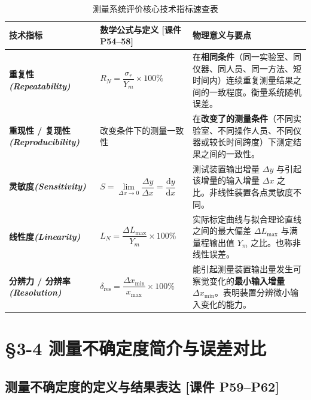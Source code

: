 \documentclass[11pt,a4paper]{ctexart}
\begin{document}
\begin{table}[htbp]
\centering
\small
\renewcommand{\arraystretch}{1.35}
\begin{tabularx}{\textwidth}{p{2.8cm}p{4.2cm}X}
\toprule
\textbf{技术指标} & \textbf{数学公式与定义 [课件 P54--58]} & \textbf{物理意义与要点} \\
\midrule
\textbf{重复性\newline\textit{(Repeatability)}} & $R_N = \dfrac{\sigma_r}{Y_m} \times 100\%$ & 在\textbf{相同条件}（同一实验室、同仪器、同人员、同一方法、短时间内）连续重复测量结果之间的一致程度。衡量系统随机误差。 \\
\midrule
\textbf{重现性 / 复现性\newline\textit{(Reproducibility)}} & 改变条件下的测量一致性 & 在\textbf{改变了的测量条件}（不同实验室、不同操作人员、不同仪器或较长时间跨度）下测定结果之间的一致性。 \\
\midrule
\textbf{灵敏度\newline\textit{(Sensitivity)}} & $S = \lim\limits_{\Delta x \to 0} \dfrac{\Delta y}{\Delta x} = \dfrac{\mathrm{d}y}{\mathrm{d}x}$ & 测试装置输出增量 $\Delta y$ 与引起该增量的输入增量 $\Delta x$ 之比。非线性装置各点灵敏度不同。 \\
\midrule
\textbf{线性度\newline\textit{(Linearity)}} & $L_N = \dfrac{\Delta L_{\max}}{Y_m} \times 100\%$ & 实际标定曲线与拟合理论直线之间的最大偏差 $\Delta L_{\max}$ 与满量程输出值 $Y_m$ 之比。也称非线性误差。 \\
\midrule
\textbf{分辨力 / 分辨率\newline\textit{(Resolution)}} & $\delta_{\text{res}} = \dfrac{\Delta x_{\min}}{x_{\max}} \times 100\%$ & 能引起测量装置输出量发生可察觉变化的\textbf{最小输入增量} $\Delta x_{\min}$。表明装置分辨微小输入变化的能力。 \\
\bottomrule
\end{tabularx}
\caption{测量系统评价核心技术指标速查表}
\end{table}

\section{§3-4 测量不确定度简介与误差对比}

\subsection{测量不确定度的定义与结果表达 \textnormal{[课件 P59--P62]}}
\end{document}
